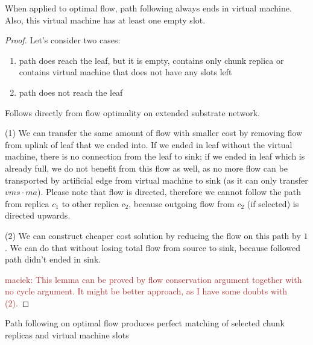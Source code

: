 \documentclass[9pt,twocolumn]{scrartcl}
\newcommand{\maciek}[1]{\textcolor{brown}{maciek: #1}}
\begin{document}
\begin{lemma}
  When applied to optimal flow, path following always ends in virtual machine. Also, this virtual machine has at least one empty slot.
\end{lemma}
\begin{proof}
  Let's consider two cases:
  \begin{enumerate}
    \item path does reach the leaf, but it is empty, contains only chunk replica or contains virtual machine that does not have any slots left
    \item path does not reach the leaf
  \end{enumerate}
 Follows directly from flow optimality on extended substrate network.
 
  (1) We can transfer the same amount of flow with smaller cost by removing flow from uplink of leaf that we ended into. If we ended in leaf without the virtual machine, there is no connection from the leaf to sink; if we ended in leaf which is already full, we do not benefit from this flow as well, as no more flow can be transported by artificial edge from virtual machine to sink (as it can only transfer $vms \cdot ma$). Please note that flow is directed, therefore we cannot follow the path from replica $c_1$ to other replica $c_2$, because outgoing flow from $c_2$ (if selected) is directed upwards.

  (2) We can construct cheaper cost solution by reducing the flow on this path by $1$. We can do that without losing total flow from source to sink, because followed path didn't ended in sink.

 \maciek{This lemma can be proved by flow conservation argument together with no cycle argument. It might be better approach, as I have some doubts with (2).}
\end{proof}

\begin{corollary}Path following on optimal flow produces perfect matching of selected chunk replicas and virtual machine slots
\end{corollary}

\end{document}
